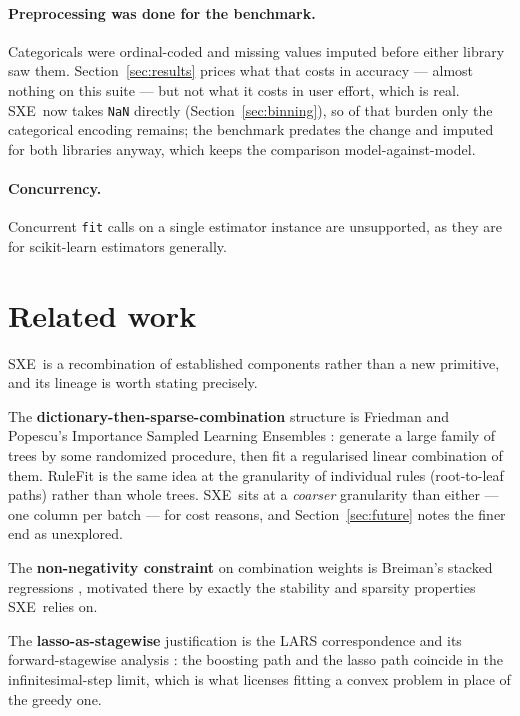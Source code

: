 \documentclass[11pt,a4paper]{article}
\newcommand{\code}[1]{\texttt{\small #1}}
\newcommand{\SXE}{\textsc{SXE}}
\theoremstyle{definition}
\begin{document}
\paragraph{Preprocessing was done for the benchmark.} Categoricals were
ordinal-coded and missing values imputed before either library saw them.
Section~\ref{sec:results} prices what that costs in accuracy --- almost nothing
on this suite --- but not what it costs in user effort, which is real. \SXE\ now
takes \code{NaN} directly (Section~\ref{sec:binning}), so of that burden only
the categorical encoding remains; the benchmark predates the change and imputed
for both libraries anyway, which keeps the comparison model-against-model.

\paragraph{Concurrency.} Concurrent \code{fit} calls on a single estimator
instance are unsupported, as they are for scikit-learn estimators generally.

\section{Related work}\label{sec:related}

\SXE\ is a recombination of established components rather than a new primitive,
and its lineage is worth stating precisely.

The \textbf{dictionary-then-sparse-combination} structure is Friedman and
Popescu's Importance Sampled Learning Ensembles \cite{friedman2003isle}:
generate a large family of trees by some randomized procedure, then fit a
regularised linear combination of them. RuleFit \cite{friedman2008rulefit} is
the same idea at the granularity of individual rules (root-to-leaf paths)
rather than whole trees. \SXE\ sits at a \emph{coarser} granularity than either
--- one column per batch --- for cost reasons, and Section~\ref{sec:future}
notes the finer end as unexplored.

The \textbf{non-negativity constraint} on combination weights is Breiman's
stacked regressions \cite{breiman1996stacked}, motivated there by exactly the
stability and sparsity properties \SXE\ relies on.

The \textbf{lasso-as-stagewise} justification is the LARS correspondence
\cite{efron2004lars} and its forward-stagewise analysis
\cite{hastie2007forward}: the boosting path and the lasso path coincide in the
infinitesimal-step limit, which is what licenses fitting a convex problem in
place of the greedy one.
\end{document}
